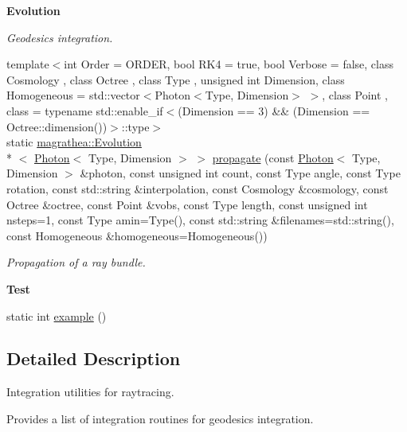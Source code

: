 \begin{Indent}{\bf Evolution}
\begin{DoxyCompactItemize}
\begin{DoxyCompactList}\small\item\em Geodesics integration. \end{DoxyCompactList}\item 
{\footnotesize template$<$int Order = O\-R\-D\-E\-R, bool R\-K4 = true, bool Verbose = false, class Cosmology , class Octree , class Type , unsigned int Dimension, class Homogeneous  = std\-::vector$<$\-Photon$<$\-Type, Dimension$>$ $>$, class Point , class  = typename std\-::enable\-\_\-if$<$(\-Dimension == 3) \&\& (\-Dimension == Octree\-::dimension())$>$\-::type$>$ }\\static \hyperlink{exceptionmagrathea_1_1Evolution}{magrathea\-::\-Evolution}\\*
$<$ \hyperlink{exceptionPhoton}{Photon}$<$ Type, Dimension $>$ $>$ \hyperlink{exceptionIntegrator_a7e0e97f32880308e1acbe73fb66e05f9}{propagate} (const \hyperlink{exceptionPhoton}{Photon}$<$ Type, Dimension $>$ \&photon, const unsigned int count, const Type angle, const Type rotation, const std\-::string \&interpolation, const Cosmology \&cosmology, const Octree \&octree, const Point \&vobs, const Type length, const unsigned int nsteps=1, const Type amin=Type(), const std\-::string \&filenames=std\-::string(), const Homogeneous \&homogeneous=Homogeneous())
\begin{DoxyCompactList}\small\item\em Propagation of a ray bundle. \end{DoxyCompactList}\end{DoxyCompactItemize}
\end{Indent}
\begin{Indent}{\bf Test}\par
\begin{DoxyCompactItemize}
\item 
static int \hyperlink{exceptionIntegrator_a27277665213cd072e01fe568221acfb5}{example} ()
\end{DoxyCompactItemize}
\end{Indent}


\subsection{Detailed Description}
Integration utilities for raytracing. 

Provides a list of integration routines for geodesics integration. 

